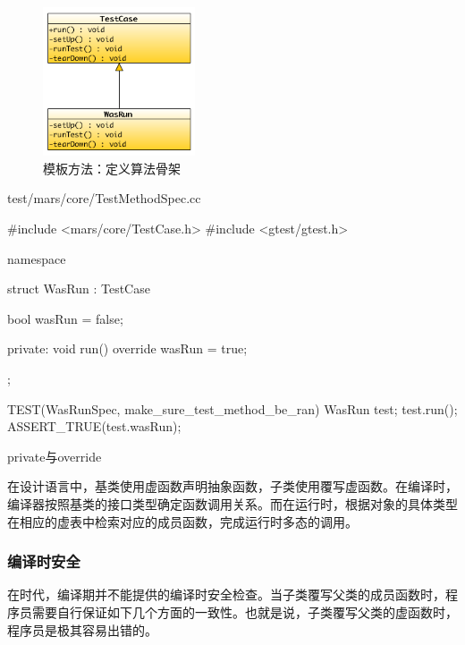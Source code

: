 \begin{content}
\begin{figure}[H]
\centering
\includegraphics[width=0.4\textwidth]{figures/xunit/simple-test.png}
\caption{模板方法：定义算法骨架}
 \label{fig:simple-test}
\end{figure}

\begin{nodiff}{test/mars/core/TestMethodSpec.cc}
 \begin{c++}
#include <mars/core/TestCase.h>
#include <gtest/gtest.h>

namespace {
  struct WasRun : TestCase {
    bool wasRun = false;

  private:
    void run() override {
      wasRun = true;
    }
  };
}

TEST(WasRunSpec, make_sure_test_method_be_ran) {
  WasRun test;
  test.run();
  ASSERT_TRUE(test.wasRun);
}
  \end{c++}
\end{nodiff}

\begin{episode}{private与override}
\begin{content}

在设计语言中，基类使用虚函数声明抽象函数，子类使用覆写虚函数。在编译时，编译器按照基类的接口类型确定函数调用关系。而在运行时，根据对象的具体类型在相应的虚表中检索对应的成员函数，完成运行时多态的调用。

\subsubsection{编译时安全}

在时代，编译期并不能提供的编译时安全检查。当子类覆写父类的成员函数时，程序员需要自行保证如下几个方面的一致性。也就是说，子类覆写父类的虚函数时，程序员是极其容易出错的。

\begin{enum}
\end{enum}


\end{content}
\end{episode}
\end{content}
